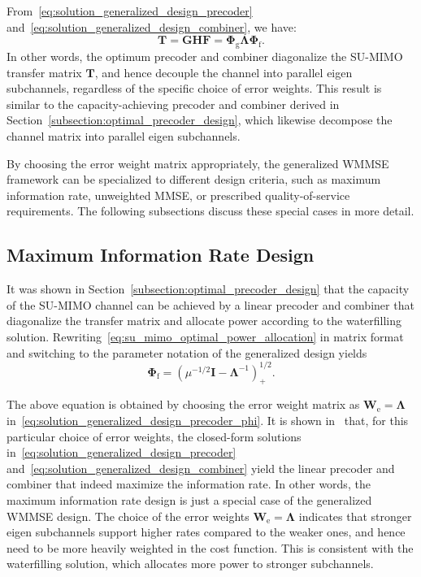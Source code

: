 From~\eqref{eq:solution_generalized_design_precoder} and~\eqref{eq:solution_generalized_design_combiner}, we have:
\begin{equation}
\label{eq:diagonalization_transfer_matrix_generalized_design}
    \mathbf{T} = \mathbf{G}\mathbf{H}\mathbf{F} = \mathbf{\Phi}_{\mathrm{g}} \mathbf{\Lambda} \mathbf{\Phi}_{\mathrm{f}}.
\end{equation}
In other words, the optimum precoder and combiner diagonalize the \ac{SU}-\ac{MIMO} transfer matrix $\mathbf{T}$, and hence decouple the channel into parallel eigen subchannels, regardless of the specific choice of error weights.
This result is similar to the capacity-achieving precoder and combiner derived in Section~\ref{subsection:optimal_precoder_design}, which likewise decompose the channel matrix into parallel eigen subchannels.

By choosing the error weight matrix appropriately, the generalized \ac{WMMSE} framework can be specialized to different design criteria, such as maximum information rate, unweighted \ac{MMSE}, or prescribed quality-of-service requirements. The following subsections discuss these special cases in more detail.

\subsection{Maximum Information Rate Design}
\label{section:maximum_information_rate_design}

It was shown in Section~\ref{subsection:optimal_precoder_design} that the capacity of the \ac{SU}-\ac{MIMO} channel can be achieved by a linear precoder and combiner that diagonalize the transfer matrix and allocate power according to the waterfilling solution.
Rewriting~\eqref{eq:su_mimo_optimal_power_allocation} in matrix format and switching to the parameter notation of the generalized design yields~\cite{su_mimo_joint_precoder_decoder_design}
\begin{equation}
\label{eq:waterfilling_power_allocation_generalized_design}
    \mathbf{\Phi}_{\mathrm{f}} = (\mu^{-1/2} \mathbf{I} - \mathbf{\Lambda}^{-1})^{1/2}_{+}.
\end{equation}

The above equation is obtained by choosing the error weight matrix as $\mathbf{W}_{\mathrm{e}} = \mathbf{\Lambda}$ in~\eqref{eq:solution_generalized_design_precoder_phi}. 
It is shown in~\cite{su_mimo_joint_precoder_decoder_design} that, for this particular choice of error weights, the closed-form solutions in~\eqref{eq:solution_generalized_design_precoder} and~\eqref{eq:solution_generalized_design_combiner} yield the linear precoder and combiner that indeed maximize the information rate.
In other words, the maximum information rate design is just a special case of the generalized WMMSE design.
The choice of the error weights $\mathbf{W}_{\mathrm{e}} = \mathbf{\Lambda}$ indicates that stronger eigen subchannels support higher rates compared to the weaker ones, and hence need to be more heavily weighted in the cost function. This is consistent with the waterfilling solution, which allocates more power to stronger subchannels.

